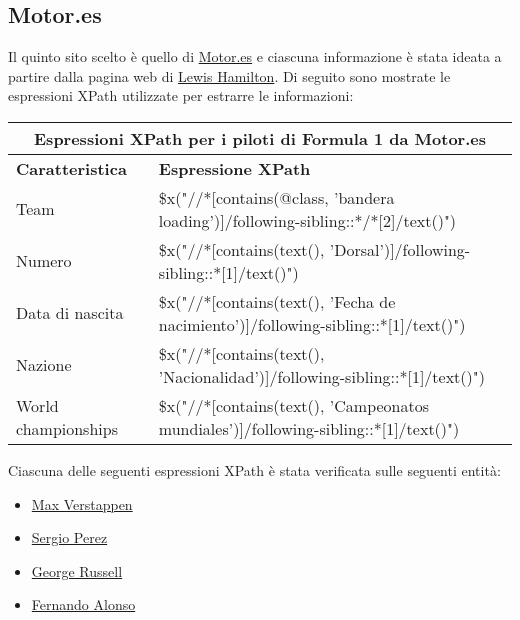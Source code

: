 \documentclass[12pt, letterpaper]{article}
\begin{document}
\subsection{Motor.es}
Il quinto sito scelto è quello di \href{https://www.motor.es}{Motor.es} e ciascuna informazione è stata ideata a partire dalla pagina web di \href{https://www.motor.es/formula-1/pilotos/lewis-hamilton}{Lewis Hamilton}. Di seguito sono mostrate le espressioni XPath utilizzate per estrarre le informazioni: 
\begin{center}
\begin{table}[!h]
\begin{tabular}{ |p{3cm}|p{9cm}| }
\hline
\multicolumn{2}{|c|}{\textbf{Espressioni XPath per i piloti di Formula 1 da Motor.es}} \\
\hline
 \hline
\textbf{Caratteristica} & \textbf{Espressione XPath} \\[1ex]
 \hline\hline
Team & \$x("//*[contains(@class, 'bandera loading')]/following-sibling::*/*[2]/text()") \\
Numero & \$x("//*[contains(text(), 'Dorsal')]/following-sibling::*[1]/text()")  \\
Data di nascita & \$x("//*[contains(text(), 'Fecha de nacimiento')]/following-sibling::*[1]/text()") \\
Nazione & \$x("//*[contains(text(), 'Nacionalidad')]/following-sibling::*[1]/text()") \\
World championships & \$x("//*[contains(text(), 'Campeonatos mundiales')]/following-sibling::*[1]/text()") \\
 \hline
\end{tabular}
\end{table}
\end{center}

Ciascuna delle seguenti espressioni XPath è stata verificata sulle seguenti entità:
\begin{itemize}
    \item \href{https://www.motor.es/formula-1/pilotos/max-verstappen}{Max Verstappen}
    \item \href{https://www.motor.es/formula-1/pilotos/sergio-perez}{Sergio Perez}
    \item \href{https://www.motor.es/formula-1/pilotos/george-russell}{George Russell}
    \item \href{https://www.motor.es/formula-1/pilotos/fernando-alonso}{Fernando Alonso}
\end{itemize}
\end{document}
